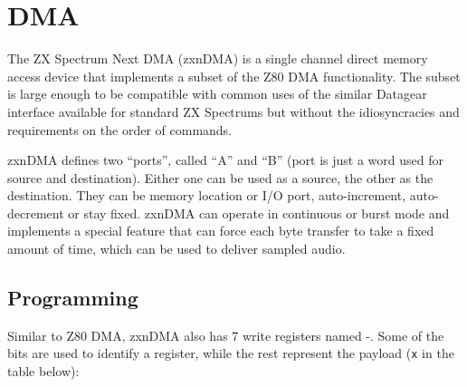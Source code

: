 \section{DMA}
\label{zx_next_dma}




The ZX Spectrum Next DMA (zxnDMA) is a single channel direct memory access device that implements a subset of the Z80 DMA functionality. The subset is large enough to be compatible with common uses of the similar Datagear interface available for standard ZX Spectrums but without the idiosyncracies and requirements on the order of commands.

zxnDMA defines two ``ports'', called ``A'' and ``B'' (port is just a word used for source and destination). Either one can be used as a source, the other as the destination. They can be memory location or I/O port, auto-increment, auto-decrement or stay fixed. zxnDMA can operate in continuous or burst mode and implements a special feature that can force each byte transfer to take a fixed amount of time, which can be used to deliver sampled audio.


\subsection{Programming}

Similar to Z80 DMA, zxnDMA also has 7 write registers named -. Some of the bits are used to identify a register, while the rest represent the payload ({\tt x} in the table below):



